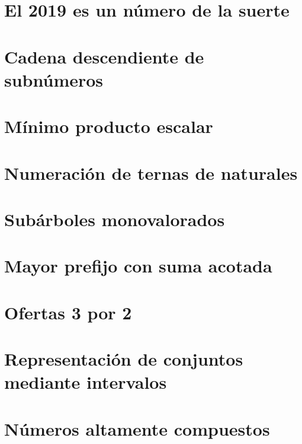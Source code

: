 \documentclass[a4paper,12pt,twoside]{book}
\begin{document}
\chapter{El 2019 es un número de la suerte}
\label{190104}


\chapter{Cadena descendiente de subnúmeros}
\label{190107}

\chapter{Mínimo producto escalar}
\label{190108}

\chapter{Numeración de ternas de naturales}
\label{190109}

\chapter{Subárboles monovalorados}
\label{190110}

\chapter{Mayor prefijo con suma acotada}
\label{190111}


\chapter{Ofertas 3 por 2}
\label{190114}

\chapter{Representación de conjuntos mediante intervalos}
\label{190115}

\chapter{Números altamente compuestos}
\label{190116}
\end{document}
